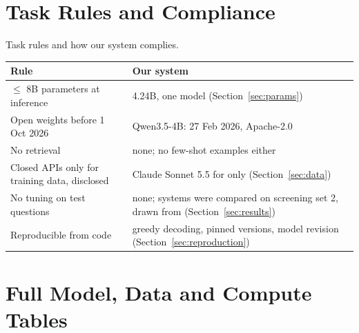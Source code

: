 \section{Task Rules and Compliance}\label{app:rules}

\begin{center}\captionsetup{type=table}
\small
\caption{Task rules and how our system complies.}\label{tab:rules}
\begin{tabularx}{\columnwidth}{@{}L{0.36\columnwidth}Y@{}}
\toprule
Rule & Our system \\
\midrule
$\leq$ 8B parameters at inference & 4.24B, one model (Section~\ref{sec:params}) \\
Open weights before 1 Oct 2026 & Qwen3.5-4B: 27 Feb 2026, Apache-2.0 \\
No retrieval & none; no few-shot examples either \\
Closed APIs only for training data, disclosed & Claude Sonnet 5.5 for \sinmulu{} only (Section~\ref{sec:data}) \\
No tuning on test questions & none; systems were compared on screening set 2, drawn from \sinmulu{} (Section~\ref{sec:results}) \\
Reproducible from code & greedy decoding, pinned versions, model revision (Section~\ref{sec:reproduction}) \\
\bottomrule
\end{tabularx}
\end{center}

\section{Full Model, Data and Compute Tables}\label{app:tables}

